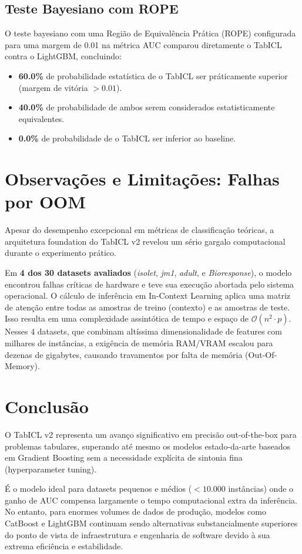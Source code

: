 \documentclass[12pt,a4paper]{article}
\begin{document}
\subsection{Teste Bayesiano com ROPE}
O teste bayesiano com uma Região de Equivalência Prática (ROPE) configurada para uma margem de 0.01 na métrica AUC comparou diretamente o TabICL contra o LightGBM, concluindo:
\begin{itemize}
    \item \textbf{60.0\%} de probabilidade estatística de o TabICL ser práticamente superior (margem de vitória $> 0.01$).
    \item \textbf{40.0\%} de probabilidade de ambos serem considerados estatisticamente equivalentes.
    \item \textbf{0.0\%} de probabilidade de o TabICL ser inferior ao baseline.
\end{itemize}

\section{Observações e Limitações: Falhas por OOM}
\label{sec:limitacoes}

Apesar do desempenho excepcional em métricas de classificação teóricas, a arquitetura foundation do TabICL v2 revelou um sério gargalo computacional durante o experimento prático. 

Em \textbf{4 dos 30 datasets avaliados} (\textit{isolet}, \textit{jm1}, \textit{adult}, e \textit{Bioresponse}), o modelo encontrou falhas críticas de hardware e teve sua execução abortada pelo sistema operacional. O cálculo de inferência em In-Context Learning aplica uma matriz de atenção entre todas as amostras de treino (contexto) e as amostras de teste. Isso resulta em uma complexidade assintótica de tempo e espaço de $\mathcal{O}(n^2 \cdot p)$. Nesses 4 datasets, que combinam altíssima dimensionalidade de features com milhares de instâncias, a exigência de memória RAM/VRAM escalou para dezenas de gigabytes, causando travamentos por falta de memória (Out-Of-Memory).

\section{Conclusão}

O TabICL v2 representa um avanço significativo em precisão out-of-the-box para problemas tabulares, superando até mesmo os modelos estado-da-arte baseados em Gradient Boosting sem a necessidade explícita de sintonia fina (hyperparameter tuning). 

É o modelo ideal para datasets pequenos e médios ($< 10.000$ instâncias) onde o ganho de AUC compensa largamente o tempo computacional extra da inferência. No entanto, para enormes volumes de dados de produção, modelos como CatBoost e LightGBM continuam sendo alternativas substancialmente superiores do ponto de vista de infraestrutura e engenharia de software devido à sua extrema eficiência e estabilidade.
\end{document}
